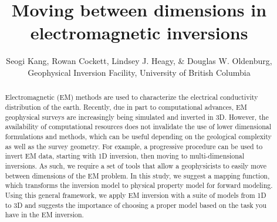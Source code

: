 \documentclass{segabs}
\newcommand{\SimPEG}{\textsc{SimPEG}\xspace}
\newcommand{\simpegEM}{\textsc{simpegEM}\xspace}
\begin{document}
\title{Moving between dimensions in electromagnetic inversions}

\renewcommand{\thefootnote}{\fnsymbol{footnote}}

\author{Seogi Kang\footnotemark[1], Rowan Cockett, Lindsey J. Heagy, \& Douglas W. Oldenburg, Geophysical Inversion Facility, University of British Columbia}


\maketitle
\begin{abstract}
Electromagnetic (EM) methods are used to characterize the electrical conductivity distribution of the earth. Recently, due in part to computational advances, EM geophysical surveys are increasingly being simulated and inverted in 3D. However, the availability of computational resources does not invalidate the use of lower dimensional formulations and methods, which can be useful depending on the geological complexity as well as the survey geometry. For example, a progressive procedure can be used to invert EM data, starting with 1D inversion, then moving to multi-dimensional inversions. As such, we require a set of tools that allow a geophysicists to easily move between dimensions of the EM problem. In this study, we suggest a mapping function, which transforms the inversion model to physical property model for forward modeling. Using this general framework, we apply EM inversion with a suite of models from 1D to 3D and suggests the importance of choosing a proper model based on the task you have in the EM inversion.
\end{abstract}
\renewcommand{\figdir}{Fig} %
\end{document}
